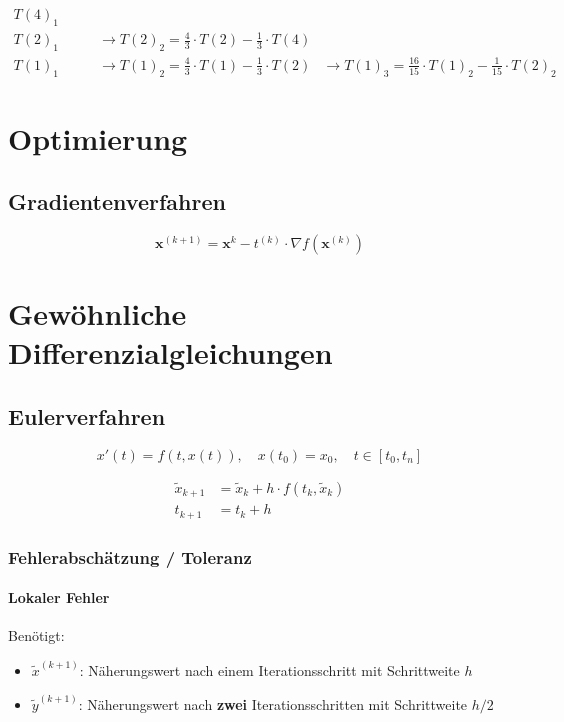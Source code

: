 \documentclass[a4paper, twoside]{article}
\begin{document}
\begin{align*}
  T(4)_{1} &&\\
  T(2)_{1} & \qquad\rightarrow T(2)_{2} = \frac{4}{3} \cdot T(2) - \frac{1}{3} \cdot T(4) &&\\
  T(1)_{1} & \qquad\rightarrow T(1)_{2} = \frac{4}{3} \cdot T(1) - \frac{1}{3} \cdot T(2) & \rightarrow T(1)_{3} = \frac{16}{15} \cdot T(1)_{2} - \frac{1}{15} \cdot T(2)_{2}
\end{align*}

\section{Optimierung}

\subsection{Gradientenverfahren}

\[\mathbf{x}^{(k+1)} = \mathbf{x}^{k} - t^{(k)} \cdot \nabla f\left(\mathbf{x}^{(k)}\right)\]

\section{Gewöhnliche Differenzialgleichungen}

\subsection{Eulerverfahren}

\[x'(t) = f(t, x(t)),\quad x(t_{0}) = x_{0},\quad t \in [t_{0}, t_{n}]\]

\begin{align*}
  \tilde{x}_{k+1} &= \tilde{x}_{k} + h \cdot f(t_{k}, \tilde{x}_{k})\\[1em]
  t_{k+1} &= t_{k} + h
\end{align*}

\subsubsection{Fehlerabschätzung / Toleranz}

\paragraph{Lokaler Fehler}

Benötigt:

\begin{itemize}
\item \(\tilde{x}^{(k+1)}\): Näherungswert nach einem Iterationsschritt mit Schrittweite \(h\)
\item \(\tilde{y}^{(k+1)}\): Näherungswert nach \textbf{zwei} Iterationsschritten mit Schrittweite \(h/2\)
\end{itemize}
\end{document}
